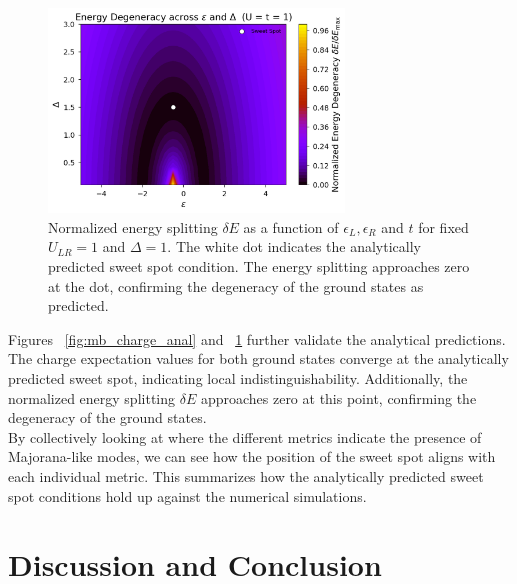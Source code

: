\documentclass[11pt, letterpaper, titlepage]{article}
\begin{document}
\begin{figure}
  \centering
  \includegraphics[width=0.7\textwidth]{../Figures/degen_anal.png}
  \caption{Normalized energy splitting $\delta E$ as a function of $ϵ_L,ϵ_R$ and $t$ for fixed $U_{LR} = 1$ and $Δ = 1$. The white dot indicates the analytically predicted sweet spot condition. The energy splitting approaches zero at the dot, confirming the degeneracy of the ground states as predicted.}
  \label{fig:mb_deltaE_anal}
\end{figure}
Figures ~\ref{fig:mb_charge_anal} and ~\ref{fig:mb_deltaE_anal} further validate the analytical predictions. The charge expectation values for both ground states converge at the analytically predicted sweet spot, indicating local indistinguishability. Additionally, the normalized energy splitting $\delta E$ approaches zero at this point, confirming the degeneracy of the ground states.\\
By collectively looking at where the different metrics indicate the presence of Majorana-like modes, we can see how the position of the sweet spot aligns with each individual metric. This summarizes how the analytically predicted sweet spot conditions hold up against the numerical simulations.
\newpage
\section{Discussion and Conclusion}
\end{document}
